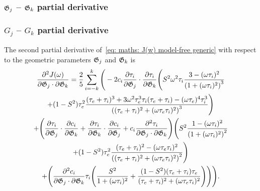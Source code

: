 \begin{latexonly}
    \subsubsection{$\mathfrak{G}_j$ -- $\mathfrak{G}_k$ partial derivative}
\end{latexonly}
\begin{htmlonly}
    \subsubsection{$G_j$ -- $G_k$ partial derivative}
\end{htmlonly}

The second partial derivative of~\eqref{eq: maths: J(w) model-free generic} with respect to the geometric parameters $\mathfrak{G}_j$ and $\mathfrak{G}_k$ is
\begin{multline}
    \frac{\partial^2 J(\omega)}{\partial \mathfrak{G}_j \cdot \partial \mathfrak{G}_k} = \frac{2}{5} \sum_{i=-k}^k \Bigg(
        -2 c_i \frac{\partial \tau_i}{\partial \mathfrak{G}_j} \cdot \frac{\partial \tau_i}{\partial \mathfrak{G}_k} \Bigg(
            S^2 \omega^2 \tau_i \frac{3 - (\omega \tau_i)^2}{\left(1 + (\omega \tau_i)^2 \right)^3}  \\
            + (1 - S^2) \tau_e^2 \frac{(\tau_e + \tau_i)^3  +  3 \omega^2 \tau_e^3 \tau_i (\tau_e + \tau_i)  -  (\omega \tau_e)^4 \tau_i^3}
                {\left((\tau_e + \tau_i)^2 + (\omega \tau_e \tau_i)^2 \right)^3}
        \Bigg) \\
        + \Bigg(
            \frac{\partial \tau_i}{\partial \mathfrak{G}_j} \cdot \frac{\partial c_i}{\partial \mathfrak{G}_k}
            + \frac{\partial \tau_i}{\partial \mathfrak{G}_k} \cdot \frac{\partial c_i}{\partial \mathfrak{G}_j}
            + c_i \frac{\partial^2 \tau_i}{\partial \mathfrak{G}_j \cdot \partial \mathfrak{G}_k}
        \Bigg)
        \Bigg(
            S^2 \frac{1 - (\omega \tau_i)^2}{\left(1 + (\omega \tau_i)^2 \right)^2} \\
            + (1 - S^2) \tau_e^2 \frac{(\tau_e + \tau_i)^2 - (\omega \tau_e \tau_i)^2}{\left((\tau_e + \tau_i)^2 + (\omega \tau_e \tau_i)^2 \right)^2}
        \Bigg) \\
        + \Bigg(
            \frac{\partial^2 c_i}{\partial \mathfrak{G}_j \cdot \partial \mathfrak{G}_k} \tau_i \Bigg(
                \frac{S^2}{1 + (\omega \tau_i)^2}
                + \frac{(1 - S^2)(\tau_e + \tau_i)\tau_e}{(\tau_e + \tau_i)^2 + (\omega \tau_e \tau_i)^2}
            \Bigg)
        \Bigg)
    \Bigg).
\end{multline}
                


